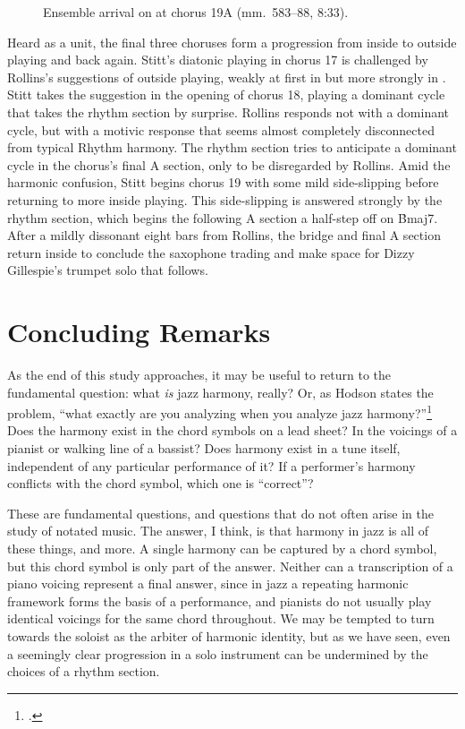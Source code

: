 \begin{figure}[tbp]
  \caption[Ensemble arrival on \protect\h{Bmaj7} at chorus
  \protect{}.]{%
    Ensemble arrival on \protect{} at chorus
    {\protect\ssliningfont19A} (mm.~583--88, 8:33).}
  \label{et:ens-side-slipping}
\end{figure}

Heard as a unit, the final three choruses form a progression from inside to
outside playing and back again. Stitt's diatonic playing in chorus 17 is
challenged by Rollins's suggestions of outside playing, weakly at first in
 but more strongly in . Stitt takes the suggestion in
the opening of chorus 18, playing a dominant cycle that takes the rhythm
section by surprise. Rollins responds not with a dominant cycle, but with a
motivic response that seems almost completely disconnected from typical Rhythm
harmony. The rhythm section tries to anticipate a dominant cycle in the
chorus's final A section, only to be disregarded by Rollins. Amid the
harmonic confusion, Stitt begins chorus 19 with some mild side-slipping before
returning to more inside playing. This side-slipping is answered strongly by
the rhythm section, which begins the following A section a half-step off on
\h{Bmaj7}. After a mildly dissonant eight bars from Rollins, the bridge and
final A section return inside to conclude the saxophone trading and make space
for Dizzy Gillespie's trumpet solo that follows.

\section{Concluding Remarks}

As the end of this study approaches, it may be useful to return to the
fundamental question: what \emph{is} jazz harmony, really? Or, as Hodson
states the problem, ``what exactly are you analyzing when you analyze jazz
harmony?''\footcite[52]{hodson:2007} Does the harmony exist in the chord
symbols on a lead sheet? In the voicings of a pianist or walking line of a
bassist? Does harmony exist in a tune itself, independent of any particular
performance of it? If a performer's harmony conflicts with the chord symbol,
which one is ``correct''?

These are fundamental questions, and questions that do not often arise in the
study of notated music. The answer, I think, is that harmony in jazz is all of
these things, and more. A single harmony can be captured by a chord symbol,
but this chord symbol is only part of the answer. Neither can a transcription
of a piano voicing represent a final answer, since in jazz a repeating
harmonic framework forms the basis of a performance, and pianists do not
usually play identical voicings for the same chord throughout. We may be
tempted to turn towards the soloist as the arbiter of harmonic identity, but
as we have seen, even a seemingly clear progression in a solo instrument can
be undermined by the choices of a rhythm section.

